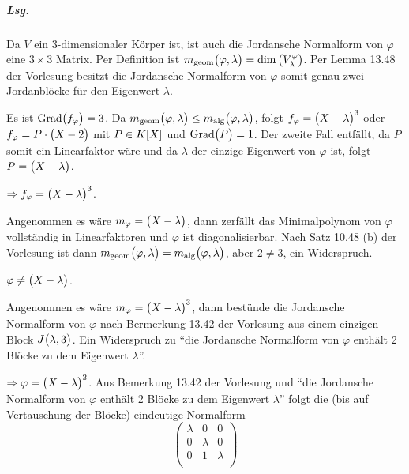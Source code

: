 \documentclass{scrreprt}
\newcommand\Grad{\text{Grad}}
\begin{document}
\subparagraph{Lsg.} Da $V$ ein $3$-dimensionaler Körper ist, ist auch die
Jordansche Normalform von $\varphi$ eine $3 \times 3$ Matrix.
Per Definition ist $m_{\text{geom}}\qty\big(\varphi, \lambda) =
\dim\qty\big(V_{\lambda}^{\varphi})$.
Per Lemma 13.48 der Vorlesung besitzt die Jordansche Normalform von $\varphi$
somit genau zwei Jordanblöcke für den Eigenwert $\lambda$.

Es ist $\Grad\qty\big(f_{\varphi}) = 3$.
Da $m_{\text{geom}}\qty\big(\varphi, \lambda) \leq
m_{\text{alg}}\qty\big(\varphi, \lambda)$, folgt
$f_{\varphi} = \qty\big(X - \lambda)^3$ oder
$f_{\varphi} = P \cdot \qty\big(X - 2)$ mit $P \in K\qty[X]$ und
$\Grad\qty\big(P) = 1$.
Der zweite Fall entfällt, da $P$ somit ein Linearfaktor wäre und
da $\lambda$ der einzige Eigenwert von $\varphi$ ist, folgt
$P = \qty\big(X - \lambda)$.

\noindent
$\Rightarrow f_{\varphi} = \qty\big(X - \lambda)^3$.

\noindent
Angenommen es wäre $m_{\varphi} = \qty\big(X - \lambda)$, dann zerfällt
das Minimalpolynom von $\varphi$ vollständig in Linearfaktoren und
$\varphi$ ist diagonalisierbar.
Nach Satz 10.48 (b) der Vorlesung ist dann
$m_{\text{geom}}\qty\big(\varphi, \lambda) =
m_{\text{alg}}\qty\big(\varphi, \lambda)$, aber $2 \ne 3$, ein Widerspruch.

\noindent
$\varphi \ne \qty\big(X - \lambda)$.

Angenommen es wäre $m_{\varphi} = \qty\big(X - \lambda)^3$, dann bestünde die
Jordansche Normalform von $\varphi$ nach Bermerkung 13.42 der Vorlesung
aus einem einzigen Block $J\qty\big(\lambda, 3)$.
Ein Widerspruch zu ``die Jordansche Normalform von $\varphi$ enthält 2 Blöcke
zu dem Eigenwert $\lambda$''.

\noindent
$\Rightarrow \varphi = \qty\big(X - \lambda)^2$.
Aus Bemerkung 13.42 der Vorlesung und ``die Jordansche Normalform von $\varphi$
enthält 2 Blöcke zu dem Eigenwert $\lambda$'' folgt die (bis auf Vertauschung
der Blöcke) eindeutige Normalform
\[
  \begin{pmatrix}
    \lambda & 0 & 0 \\
    0 & \lambda & 0 \\
    0 & 1 & \lambda \\
  \end{pmatrix}
\]
\end{document}

